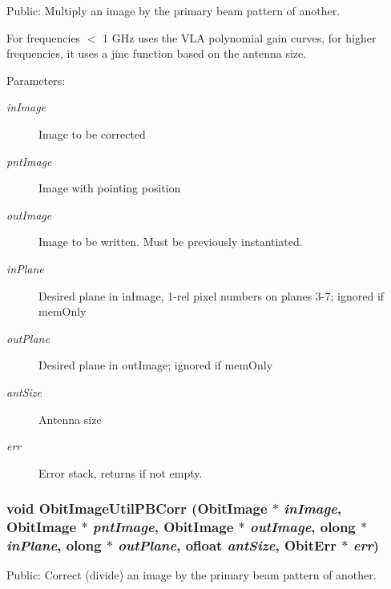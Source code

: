 Public: Multiply an image by the primary beam pattern of another. 

For frequencies $<$ 1 GHz uses the VLA polynomial gain curves, for higher frequencies, it uses a jinc function based on the antenna size. \begin{Desc}
\item[Parameters:]
\begin{description}
\item[{\em in\-Image}]Image to be corrected \item[{\em pnt\-Image}]Image with pointing position \item[{\em out\-Image}]Image to be written. Must be previously instantiated. \item[{\em in\-Plane}]Desired plane in in\-Image, 1-rel pixel numbers on planes 3-7; ignored if mem\-Only \item[{\em out\-Plane}]Desired plane in out\-Image; ignored if mem\-Only \item[{\em ant\-Size}]Antenna size \item[{\em err}]Error stack, returns if not empty. \end{description}
\end{Desc}
\subsubsection{\setlength{\rightskip}{0pt plus 5cm}void Obit\-Image\-Util\-PBCorr ({\bf Obit\-Image} $\ast$ {\em in\-Image}, {\bf Obit\-Image} $\ast$ {\em pnt\-Image}, {\bf Obit\-Image} $\ast$ {\em out\-Image}, {\bf olong} $\ast$ {\em in\-Plane}, {\bf olong} $\ast$ {\em out\-Plane}, {\bf ofloat} {\em ant\-Size}, {\bf Obit\-Err} $\ast$ {\em err})}\label{ObitImageUtil_8c_a12}


Public: Correct (divide) an image by the primary beam pattern of another. 

